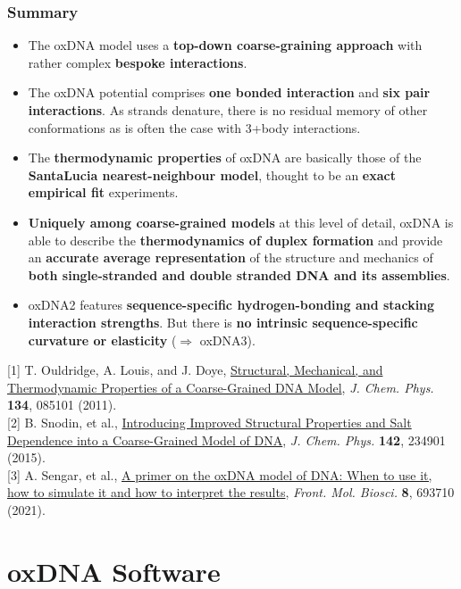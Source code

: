 \documentclass[slidestop,compress,9pt]{beamer}
\begin{document}
\begin{frame}
\frametitle{Summary}
\vspace*{0.25cm}
\small
\begin{itemize}
\setlength\itemsep{5pt}
\item The oxDNA model uses a \textbf{top-down coarse-graining approach} with rather complex \textbf{bespoke interactions}.
\item The oxDNA potential comprises \textbf{one bonded interaction} and \textbf{six pair interactions}. As strands denature, there is no residual memory of other conformations as is often the case with 3+body interactions.
\item The \textbf{thermodynamic properties} of oxDNA are basically those of the \textbf{SantaLucia nearest-neighbour model}, thought to be an \textbf{exact empirical fit} experiments. 
\item \textbf{Uniquely among coarse-grained  models} at this level of detail, oxDNA is able to describe the \textbf{thermodynamics of duplex formation} and provide an \textbf{accurate average representation} of the structure and mechanics of \textbf{both single-stranded and double stranded DNA and its assemblies}.
\item oxDNA2 features \textbf{sequence-specific hydrogen-bonding and stacking interaction strengths}. But there is \textbf{no intrinsic sequence-specific curvature or elasticity} ($\Rightarrow$ oxDNA3).  
\end{itemize}
\vspace*{0.2cm}
[1] T. Ouldridge, A. Louis, and J. Doye, \href{https://doi.org/10.1063/1.3552946}{Structural, Mechanical, and Thermodynamic Properties of a Coarse-Grained DNA Model}, \textit{J. Chem. Phys.} \textbf{134}, 085101 (2011).\\[3pt]
[2] B. Snodin, et al., \href{https://doi.org/10.1063/1.4921957}{Introducing Improved Structural Properties and Salt Dependence into a Coarse-Grained Model of DNA}, \textit{J. Chem. Phys.}  \textbf{142}, 234901 (2015).\\[3pt]
[3] A. Sengar, et al., \href{https://doi.org/10.3389/fmolb.2021.693710}{A primer on the oxDNA model of DNA: When to use it, how to simulate it and how to interpret the results}, \textit{Front. Mol. Biosci.}  \textbf{8}, 693710 (2021).
\end{frame}


\section{oxDNA Software}
\end{document}
